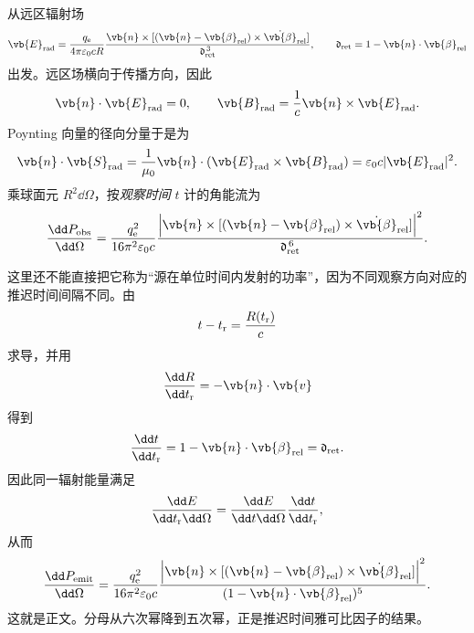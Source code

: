 \begin{derivation}[远区角通量积分与总辐射功率]

从远区辐射场
\[
\vb{E}_{\rm rad}
=
\frac{q_{\mathrm e}}{4\pi\varepsilon_0cR}
\frac{
\vb{n}\times[
(\vb{n}-\vb{\beta}_{\rm rel})
\times\dot{\vb{\beta}}_{\rm rel}]
}
{\mathfrak d_{\rm ret}^{\,3}},
\qquad
\mathfrak d_{\rm ret}
=
1-\vb{n}\cdot\vb{\beta}_{\rm rel}
\]
出发。远区场横向于传播方向，因此
\[
\vb{n}\cdot\vb{E}_{\rm rad}=0,
\qquad
\vb{B}_{\rm rad}
=
\frac1c\vb{n}\times\vb{E}_{\rm rad}.
\]
Poynting 向量的径向分量于是为
\[
\vb{n}\cdot\vb{S}_{\rm rad}
=
\frac1{\mu_0}
\vb{n}\cdot
(\vb{E}_{\rm rad}\times\vb{B}_{\rm rad})
=
\varepsilon_0c|\vb{E}_{\rm rad}|^2.
\]
乘球面元 \(R^2\dd\Omega\)，按\emph{观察时间} \(t\) 计的角能流为
\[
\frac{\dd P_{\rm obs}}{\dd\Omega}
=
\frac{q_{\mathrm e}^2}{16\pi^2\varepsilon_0c}
\frac{
\left|
\vb{n}\times[
(\vb{n}-\vb{\beta}_{\rm rel})
\times\dot{\vb{\beta}}_{\rm rel}]
\right|^2
}
{\mathfrak d_{\rm ret}^{\,6}}.
\]

这里还不能直接把它称为“源在单位时间内发射的功率”，因为不同观察方向对应的推迟时间间隔不同。由
\[
t-t_{\rm r}
=
\frac{R(t_{\rm r})}{c}
\]
求导，并用
\[
\frac{\dd R}{\dd t_{\rm r}}
=
-\vb{n}\cdot\vb{v}
\]
得到
\[
\frac{\dd t}{\dd t_{\rm r}}
=
1-\vb{n}\cdot\vb{\beta}_{\rm rel}
=
\mathfrak d_{\rm ret}.
\]
因此同一辐射能量满足
\[
\frac{\dd E}{\dd t_{\rm r}\dd\Omega}
=
\frac{\dd E}{\dd t\dd\Omega}
\frac{\dd t}{\dd t_{\rm r}},
\]
从而
\[
{
\frac{\dd P_{\rm emit}}{\dd\Omega}
=
\frac{q_{\mathrm e}^2}{16\pi^2\varepsilon_0c}
\frac{
\left|
\vb{n}\times[
(\vb{n}-\vb{\beta}_{\rm rel})
\times\dot{\vb{\beta}}_{\rm rel}]
\right|^2
}
{(1-\vb{n}\cdot\vb{\beta}_{\rm rel})^5}.
}
\]
这就是正文。分母从六次幂降到五次幂，正是推迟时间雅可比因子的结果。


\end{derivation}
